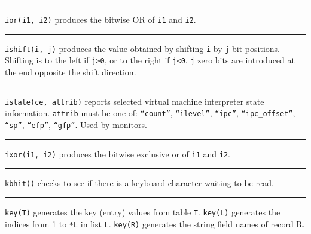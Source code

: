 \bigskip\hrule\vspace{0.1cm}

\noindent
{}\texttt{ior(i1, i2)} produces the bitwise OR of
\texttt{i1} and \texttt{i2}.

\bigskip\hrule\vspace{0.1cm}

\noindent
{}\texttt{ishift(i, j)} produces the value obtained by
shifting \texttt{i} by \texttt{j} bit positions. Shifting is to the
left if \texttt{j{\textgreater}0}, or to the right if
\texttt{j{\textless}0}. \texttt{j} zero bits are introduced at the
end opposite the shift direction.

\bigskip\hrule\vspace{0.1cm}

\noindent
\texttt{istate(ce, attrib)} reports selected virtual machine interpreter
state information. \texttt{attrib} must be one of:
\texttt{{\textquotedblleft}count{\textquotedblright}},
\texttt{{\textquotedblleft}ilevel{\textquotedblright}},
\texttt{{\textquotedblleft}ipc{\textquotedblright}},
\texttt{{\textquotedblleft}ipc\_offset{\textquotedblright}},
\texttt{{\textquotedblleft}sp{\textquotedblright}},
\texttt{{\textquotedblleft}efp{\textquotedblright}},
\texttt{{\textquotedblleft}gfp{\textquotedblright}}. Used by monitors.

\bigskip\hrule\vspace{0.1cm}

\noindent
\texttt{ixor(i1, i2)} produces the bitwise exclusive
or of \texttt{i1} and \texttt{i2}.

\bigskip\hrule\vspace{0.1cm}

\noindent
{}\texttt{kbhit()} checks to see if there is a
keyboard character waiting to be read.

\bigskip\hrule\vspace{0.1cm}

\noindent
{}\texttt{key(T)} generates the key (entry) values from
table \texttt{T}. \texttt{key(L)} generates the indices from 1 to
\texttt{*L} in list \texttt{L}. \texttt{key(R)} generates the string
field names of record R.

